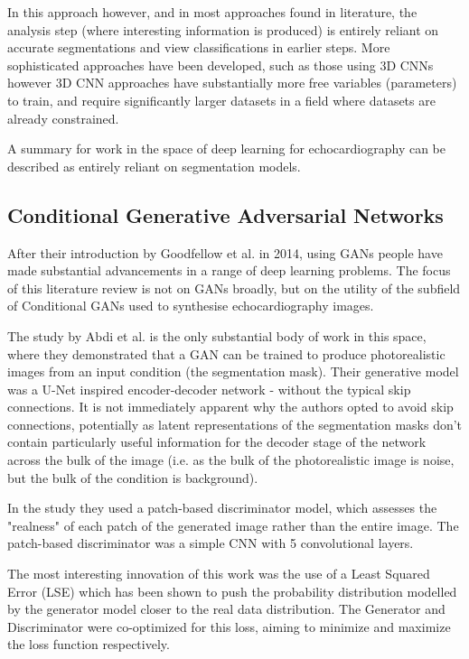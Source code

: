 In this approach however, and in most approaches found in literature, the
analysis step (where interesting information is produced) is entirely reliant on
accurate segmentations and view classifications in earlier steps. More
sophisticated approaches have been developed, such as those using 3D CNNs
\cite{ouyangEchoNetDynamicLargeNew} however 3D CNN approaches have substantially
more free variables (parameters) to train, and require significantly larger
datasets in a field where datasets are already constrained. \newline

A summary for work in the space of deep learning for echocardiography can be
described as entirely reliant on segmentation models. \newline

\subsection{Conditional Generative Adversarial Networks}

After their introduction by Goodfellow et al. in 2014, using GANs people have
made substantial advancements in a range of deep learning problems. The focus of
this literature review is not on GANs broadly, but on the utility of the
subfield of Conditional GANs used to synthesise echocardiography images.
\newline

The study by Abdi et al. is the only substantial body of work in this space,
where they demonstrated that a GAN can be trained to produce photorealistic
images from an input condition (the segmentation mask). Their generative model
was a U-Net inspired encoder-decoder network - without the typical skip
connections. It is not immediately apparent why the authors opted to avoid skip
connections, potentially as latent representations of the segmentation masks
don't contain particularly useful information for the decoder stage of the
network across the bulk of the image (i.e. as the bulk of the photorealistic
image is noise, but the bulk of the condition is background). \newline

In the study they used a patch-based discriminator model, which assesses
the "realness" of each patch of the generated image rather than the entire
image. The patch-based discriminator was a simple CNN with 5 convolutional
layers. \newline

The most interesting innovation of this work was the use of a Least Squared
Error (LSE) which has been shown to push the probability distribution modelled
by the generator model closer to the real data distribution. The Generator and
Discriminator were co-optimized for this loss, aiming to minimize and maximize
the loss function respectively.\newline

